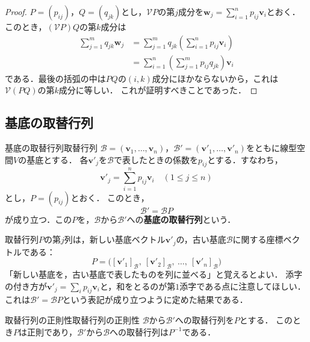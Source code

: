 \begin{leftbar}
\begin{proof}
  $P = (p_{ij})$，$Q = (q_{jk})$とし，$\mathcal{V}P$の第$j$成分を$\bm{w}_j = \sum_{i=1}^{n} p_{ij} \bm{v}_i$とおく．
  このとき，$(\mathcal{V}P)Q$の第$k$成分は
  \begin{align*}
    \sum_{j=1}^{m} q_{jk} \bm{w}_j
    &= \sum_{j=1}^{m} q_{jk} \left( \sum_{i=1}^{n} p_{ij} \bm{v}_i \right) \\
    &= \sum_{i=1}^{n} \left( \sum_{j=1}^{m} p_{ij} q_{jk} \right) \bm{v}_i
  \end{align*}
  である．最後の括弧の中は$PQ$の$(i,k)$成分にほかならないから，これは$\mathcal{V}(PQ)$の第$k$成分に等しい．
  これが証明すべきことであった．
\end{proof}
\end{leftbar}

\subsection{基底の取替行列}

\begin{definition}{基底の取替行列}{取替行列}
  $\mathcal{B} = (\bm{v}_1, \dots, \bm{v}_n)$，$\mathcal{B}' = (\bm{v}'_1, \dots, \bm{v}'_n)$をともに線型空間$V$の基底とする．
  各$\bm{v}'_j$を$\mathcal{B}$で表したときの係数を$p_{ij}$とする．すなわち，
  \[
    \bm{v}'_j = \sum_{i=1}^{n} p_{ij} \bm{v}_i \quad (1 \le j \le n)
  \]
  とし，$P = (p_{ij})$とおく．
  このとき，
  \[
    \mathcal{B}' = \mathcal{B} P
  \]
  が成り立つ．この$P$を，$\mathcal{B}$から$\mathcal{B}'$への\textbf{基底の取替行列}という．
\end{definition}

\begin{remark}[取替行列の列の意味]
  取替行列$P$の第$j$列は，新しい基底ベクトル$\bm{v}'_j$の，古い基底$\mathcal{B}$に関する座標ベクトルである：
  \[
    P = \bigl( [\bm{v}'_1]_{\mathcal{B}},~ [\bm{v}'_2]_{\mathcal{B}},~ \dots,~ [\bm{v}'_n]_{\mathcal{B}} \bigr)
  \]
  「新しい基底を，古い基底で表したものを列に並べる」と覚えるとよい．
  添字の付き方が$\bm{v}'_j = \sum_i p_{ij} \bm{v}_i$と，和をとるのが第$1$添字である点に注意してほしい．
  これは$\mathcal{B}' = \mathcal{B}P$という表記が成り立つように定めた結果である．
\end{remark}

\begin{prop}{取替行列の正則性}{取替行列の正則性}
  $\mathcal{B}$から$\mathcal{B}'$への取替行列を$P$とする．
  このとき$P$は正則であり，$\mathcal{B}'$から$\mathcal{B}$への取替行列は$P^{-1}$である．
\end{prop}

